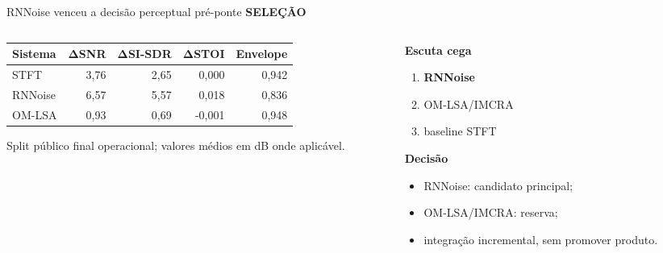 \documentclass[aspectratio=169,10pt]{beamer}
\newcommand{\kicker}[1]{%
    {\color{signalorange}\scriptsize\bfseries\MakeUppercase{#1}}\par\vspace{0.08cm}
}
\begin{document}
\begin{frame}{RNNoise venceu a decisão perceptual pré-ponte}
    \kicker{Seleção}
    \begin{columns}[T,onlytextwidth]
        \begin{column}{0.62\textwidth}
            \small
            \begin{tabularx}{\linewidth}{@{}Yrrrr@{}}
                \toprule
                \textbf{Sistema} & \(\boldsymbol{\Delta}\)\textbf{SNR} &
                \(\boldsymbol{\Delta}\)\textbf{SI-SDR} &
                \(\boldsymbol{\Delta}\)\textbf{STOI} & \textbf{Envelope} \\
                \midrule
                STFT & 3,76 & 2,65 & 0,000 & 0,942 \\
                RNNoise & 6,57 & 5,57 & 0,018 & 0,836 \\
                OM-LSA & 0,93 & 0,69 & -0,001 & 0,948 \\
                \bottomrule
            \end{tabularx}
            \vspace{0.12cm}
            {\tiny Split público final operacional; valores médios em dB onde aplicável.}
        \end{column}
        \begin{column}{0.35\textwidth}
            \textbf{Escuta cega}
            \begin{enumerate}
                \item \textcolor{softgreen}{\textbf{RNNoise}}
                \item OM-LSA/IMCRA
                \item baseline STFT
            \end{enumerate}

            \vspace{0.18cm}
            \textbf{Decisão}
            \begin{itemize}
                \item RNNoise: candidato principal;
                \item OM-LSA/IMCRA: reserva;
                \item integração incremental, sem promover produto.
            \end{itemize}
        \end{column}
    \end{columns}
\end{frame}
\end{document}
